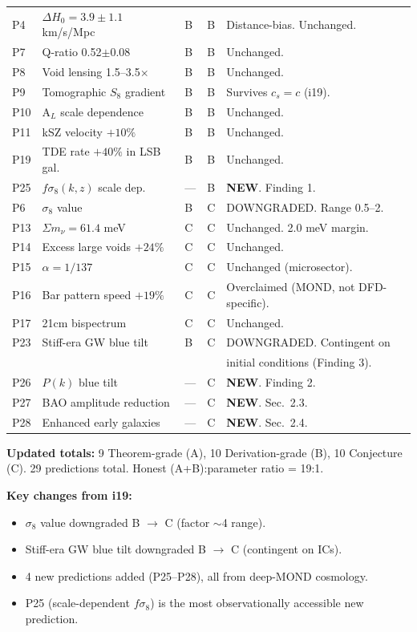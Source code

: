 \documentclass[11pt]{article}
\begin{document}
\begin{longtable}{p{0.5cm}p{4cm}p{1cm}p{1cm}p{5.5cm}}
P4 & $\Delta H_0 = 3.9 \pm 1.1$ km/s/Mpc & B & B & Distance-bias. Unchanged. \\
P7 & Q-ratio 0.52$\pm$0.08 & B & B & Unchanged. \\
P8 & Void lensing 1.5--3.5$\times$ & B & B & Unchanged. \\
P9 & Tomographic $S_8$ gradient & B & B & Survives $c_s=c$ (i19). \\
P10 & A$_L$ scale dependence & B & B & Unchanged. \\
P11 & kSZ velocity $+10\%$ & B & B & Unchanged. \\
P19 & TDE rate $+40\%$ in LSB gal.\ & B & B & Unchanged. \\
P25 & $f\sigma_8(k,z)$ scale dep.\ & --- & B & \textbf{NEW}. Finding 1. \\
\midrule
P6 & $\sigma_8$ value & B & C & DOWNGRADED. Range 0.5--2. \\
P13 & $\Sigma m_\nu = 61.4$ meV & C & C & Unchanged. 2.0 meV margin. \\
P14 & Excess large voids $+24\%$ & C & C & Unchanged. \\
P15 & $\alpha = 1/137$ & C & C & Unchanged (microsector). \\
P16 & Bar pattern speed $+19\%$ & C & C & Overclaimed (MOND, not DFD-specific). \\
P17 & 21cm bispectrum & C & C & Unchanged. \\
P23 & Stiff-era GW blue tilt & B & C & DOWNGRADED. Contingent on \\
& & & & initial conditions (Finding 3). \\
P26 & $P(k)$ blue tilt & --- & C & \textbf{NEW}. Finding 2. \\
P27 & BAO amplitude reduction & --- & C & \textbf{NEW}. Sec.~2.3. \\
P28 & Enhanced early galaxies & --- & C & \textbf{NEW}. Sec.~2.4. \\
\bottomrule
\end{longtable}

\textbf{Updated totals:} 9 Theorem-grade (A), 10 Derivation-grade (B),
10 Conjecture (C).  29 predictions total.  Honest (A+B):parameter
ratio = 19:1.

\textbf{Key changes from i19:}
\begin{itemize}
\item $\sigma_8$ value downgraded B $\to$ C (factor $\sim$4 range).
\item Stiff-era GW blue tilt downgraded B $\to$ C (contingent on ICs).
\item 4 new predictions added (P25--P28), all from deep-MOND cosmology.
\item P25 (scale-dependent $f\sigma_8$) is the most observationally
  accessible new prediction.
\end{itemize}
\end{document}
